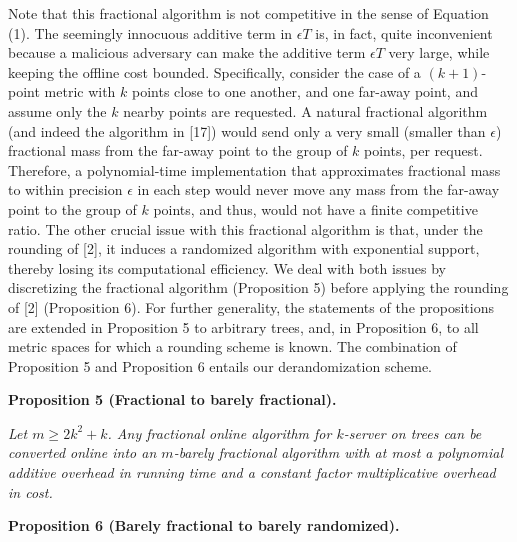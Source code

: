 \documentclass[10pt,a4paper]{article}
\begin{document}
Note that this fractional algorithm is not competitive in the sense of Equation (1). The seemingly innocuous additive term in $\epsilon T$ is, in fact, quite inconvenient because a malicious adversary can make the additive term $\epsilon T$ very large, while keeping the offline cost bounded. Specifically, consider the case of a $(k+1)$-point metric with $k$ points close to one another, and one far-away point, and assume only the $k$ nearby points are requested. A natural fractional algorithm (and indeed the algorithm in [17]) would send only a very small (smaller than $\epsilon$) fractional mass from the far-away point to the group of $k$ points, per request. Therefore, a polynomial-time implementation that approximates fractional mass to within precision $\epsilon$ in each step would never move any mass from the far-away point to the group of $k$ points, and thus, would not have a finite competitive ratio. The other crucial issue with this fractional algorithm is that, under the rounding of [2], it induces a randomized algorithm with exponential support, thereby losing its computational efficiency. We deal with both issues by discretizing the fractional algorithm (Proposition 5) before applying the rounding of [2] (Proposition 6). For further generality, the statements of the propositions are extended in Proposition 5 to arbitrary trees, and, in Proposition 6, to all metric spaces for which a rounding scheme is known. The combination of Proposition 5 and Proposition 6 entails our derandomization scheme.\par





\par\medskip\noindent\textbf{
\textbf{Proposition 5}\textbf{ }(Fractional to barely fractional)\textbf{.}
}\par



\emph{Let $m\geq 2k^{2}+k$. Any fractional online algorithm for $k$-server on trees can be converted online into an $m$-barely fractional algorithm with at most a polynomial additive overhead in running time and a constant factor multiplicative overhead in cost.}\par







\par\medskip\noindent\textbf{
\textbf{Proposition 6}\textbf{ }(Barely fractional to barely randomized)\textbf{.}
}\par
\end{document}
